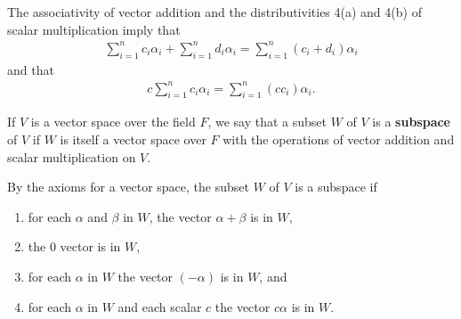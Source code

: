 \documentclass[12pt]{article}
\begin{document}
\begin{comm}
  The associativity of vector addition and the distributivities
  4(a) and 4(b) of scalar multiplication imply that
  \begin{align*}
    \sum_{i = 1}^{n}c_i\alpha_i + \sum_{i = 1}^{n}d_i\alpha_i =
    \sum_{i = 1}^{n}(c_i + d_i)\alpha_i
  \end{align*}
  and that
  \begin{align*}
    c\sum_{i = 1}^{n}c_i\alpha_i = \sum_{i =
    1}^{n}(cc_i)\alpha_i.
  \end{align*}
\end{comm}

\begin{defn}
  If $V$ is a vector space over the field $F$, we say that a subset $W$ of $V$ is a
  \textbf{subspace} of $V$ if $W$ is itself a vector space over $F$ with the
  operations of vector addition and scalar multiplication on $V$.
\end{defn}

\begin{comm}
  By the axioms for a vector space, the subset $W$ of $V$ is a subspace if
  \begin{enumerate}
    \item
      for each $\alpha$ and $\beta$ in $W$, the vector $\alpha + \beta$ is in $W$,
    \item
      the $0$ vector is in $W$,
    \item
      for each $\alpha$ in $W$ the vector $(-\alpha)$ is in $W$, and
    \item
      for each $\alpha$ in $W$ and each scalar $c$ the vector $c\alpha$ is in $W$.
  \end{enumerate}
\end{comm}
\end{document}
